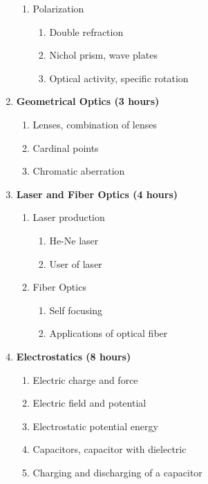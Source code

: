 \begin{enumerate}
\begin{enumerate}
        \item Polarization
        \begin{enumerate}
            \item Double refraction
            \item Nichol prism, wave plates
            \item Optical activity, specific rotation
        \end{enumerate}
    \end{enumerate}
    
    \item \textbf{Geometrical Optics \hfill (3 hours)}
    \begin{enumerate}
        \item Lenses, combination of lenses
        \item Cardinal points
        \item Chromatic aberration
    \end{enumerate}
    
    \item \textbf{Laser and Fiber Optics \hfill (4 hours)}
    \begin{enumerate}
        \item Laser production
        \begin{enumerate}
            \item He-Ne laser
            \item User of laser
        \end{enumerate}
        
        \item Fiber Optics
        \begin{enumerate}
            \item Self focusing
            \item Applications of optical fiber
        \end{enumerate}
    \end{enumerate}
    
    \item \textbf{Electrostatics \hfill (8 hours)}
    \begin{enumerate}
        \item Electric charge and force
        \item Electric field and potential 
        \item Electrostatic potential energy
        \item Capacitors, capacitor with dielectric
        \item Charging and discharging of a capacitor
    \end{enumerate}
    

\end{enumerate}
